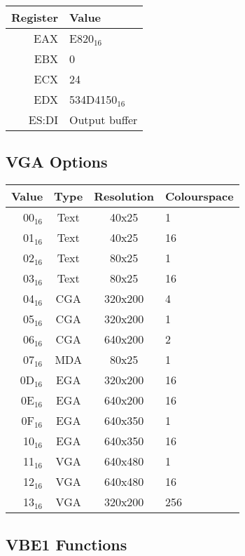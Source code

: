 \documentclass{article}
\begin{document}
\begin{tabular}{|r|l|}
	\hline
	\textbf{Register} & \textbf{Value} \\
	\hline
	EAX & E820$_{16}$ \\
	\hline
	EBX & 0 \\
	\hline
	ECX & 24 \\
	\hline
	EDX & 534D4150$_{16}$ \\
	\hline
	ES:DI & Output buffer \\
	\hline
\end{tabular}

\subsection{VGA Options}
\label{vga}

\begin{tabular}{|r|c|c|l|}
	\hline
	\textbf{Value} & \textbf{Type} & \textbf{Resolution} & \textbf{Colourspace} \\
	\hline
	00$_{16}$ & Text & 40x25 & 1 \\
	\hline
	01$_{16}$ & Text & 40x25 & 16 \\
	\hline
	02$_{16}$ & Text & 80x25 & 1 \\
	\hline
	03$_{16}$ & Text & 80x25 & 16 \\
	\hline
	04$_{16}$ & CGA & 320x200 & 4 \\
	\hline
	05$_{16}$ & CGA & 320x200 & 1 \\
	\hline
	06$_{16}$ & CGA & 640x200 & 2 \\
	\hline
	07$_{16}$ & MDA & 80x25 & 1 \\
	\hline
	0D$_{16}$ & EGA & 320x200 & 16 \\
	\hline
	0E$_{16}$ & EGA & 640x200 & 16 \\
	\hline
	0F$_{16}$ & EGA & 640x350 & 1 \\
	\hline
	10$_{16}$ & EGA & 640x350 & 16 \\
	\hline
	11$_{16}$ & VGA & 640x480 & 1 \\
	\hline
	12$_{16}$ & VGA & 640x480 & 16 \\
	\hline
	13$_{16}$ & VGA & 320x200 & 256 \\
	\hline
\end{tabular}

\subsection{VBE1 Functions}
\label{vbe}
\end{document}

